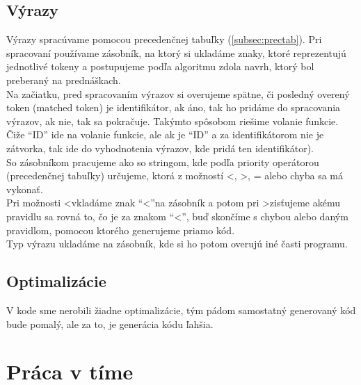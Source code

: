 \documentclass[a4paper,11pt]{article}
\begin{document}
		\subsection{Výrazy}\label{subsec:vyrazy}

			Výrazy spracúvame pomocou precedenčnej tabuľky (\ref{subsec:prectab}). Pri spracovaní používame zásobník, na ktorý si ukladáme znaky, ktoré reprezentujú jednotlivé tokeny a postupujeme podľa algoritmu zdola navrh, ktorý bol preberaný na prednáškach.\\

			\noindent Na začiatku, pred spracovaním výrazov si overujeme spätne, či posledný overený token (matched token) je identifikátor, ak áno, tak ho pridáme do spracovania výrazov, ak nie, tak sa pokračuje. Takýmto spôsobom riešime volanie funkcie. Čiže \enquote{ID} ide na volanie funkcie, ale ak je \enquote{ID} a za identifikátorom nie je zátvorka, tak ide do vyhodnotenia výrazov, kde pridá ten identifikátor).\\

			\noindent So zásobníkom pracujeme ako so stringom, kde podľa priority operátorou (precedenčnej tabuľky) určujeme, ktorá z možností \textless, \textgreater, = alebo chyba sa má vykonať.\\

			\noindent Pri možnosti \textless\quad vkladáme znak \enquote{\textless}\quad na zásobník a potom pri \textgreater\quad zisťujeme akému pravidlu sa rovná to, čo je za znakom \enquote{\textless}, buď skončíme s chybou alebo daným pravidlom, pomocou ktorého generujeme priamo kód. \\

			\noindent Typ výrazu ukladáme na zásobník, kde si ho potom overujú iné časti programu.

		\subsection{Optimalizácie}\label{subsec:opt}
			V kode sme nerobili žiadne optimalizácie, tým pádom samostatný generovaný kód bude pomalý, ale za to, je generácia kódu ľahšia.

	\section{Práca v tíme}\label{sec:tym}
\end{document}
